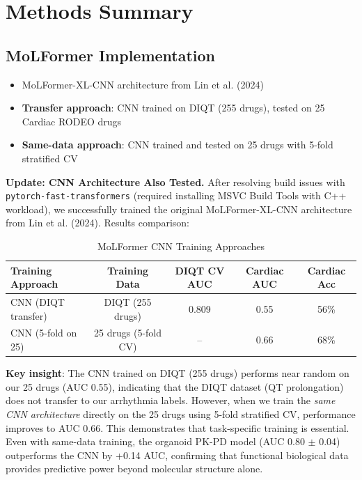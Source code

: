 \documentclass[11pt]{article}
\begin{document}
\section*{Methods Summary}

\subsection*{MoLFormer Implementation}
\begin{itemize}
    \item MoLFormer-XL-CNN architecture from Lin et al. (2024)
    \item \textbf{Transfer approach}: CNN trained on DIQT (255 drugs), tested on 25 Cardiac RODEO drugs
    \item \textbf{Same-data approach}: CNN trained and tested on 25 drugs with 5-fold stratified CV
\end{itemize}

\textbf{Update: CNN Architecture Also Tested.} After resolving build issues with \texttt{pytorch-fast-transformers} (required installing MSVC Build Tools with C++ workload), we successfully trained the original MoLFormer-XL-CNN architecture from Lin et al. (2024). Results comparison:

\begin{table}[H]
\centering
\caption{MoLFormer CNN Training Approaches}
\begin{tabular}{lcccc}
\toprule
\textbf{Training Approach} & \textbf{Training Data} & \textbf{DIQT CV AUC} & \textbf{Cardiac AUC} & \textbf{Cardiac Acc} \\
\midrule
CNN (DIQT transfer) & DIQT (255 drugs) & 0.809 & 0.55 & 56\% \\
CNN (5-fold on 25) & 25 drugs (5-fold CV) & -- & 0.66 & 68\% \\
\bottomrule
\end{tabular}
\end{table}

\textbf{Key insight}: The CNN trained on DIQT (255 drugs) performs near random on our 25 drugs (AUC 0.55), indicating that the DIQT dataset (QT prolongation) does not transfer to our arrhythmia labels. However, when we train the \textit{same CNN architecture} directly on the 25 drugs using 5-fold stratified CV, performance improves to AUC 0.66. This demonstrates that task-specific training is essential. Even with same-data training, the organoid PK-PD model (AUC 0.80 $\pm$ 0.04) outperforms the CNN by +0.14 AUC, confirming that functional biological data provides predictive power beyond molecular structure alone.
\end{document}
